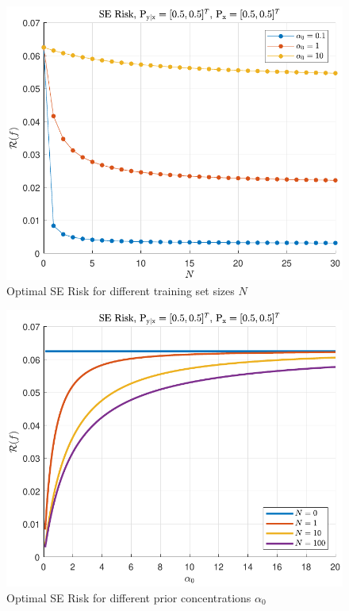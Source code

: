 \documentclass[12pt]{report}
\begin{document}
\begin{figure}
\centering
\includegraphics[scale=1.0]{Risk_SE_Dir_IO_N_leg_a0.pdf}
\caption{Optimal SE Risk for different training set sizes $N$}
\label{fig:Risk_SE_Dir_IO_N_leg_a0}
\end{figure}

\begin{figure}
\centering
\includegraphics[scale=1.0]{Risk_SE_Dir_IO_a0_leg_N.pdf}
\caption{Optimal SE Risk for different prior concentrations $\alpha_0$}
\label{fig:Risk_SE_Dir_IO_a0_leg_N}
\end{figure}
\end{document}
